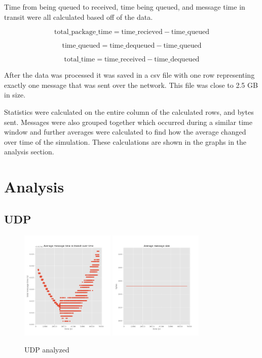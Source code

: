 \documentclass[a4paper,12pt]{article}
\begin{document}
Time from being queued to received, time being queued, and message time in
transit were all calculated based off of the data.

\[\text{total\_package\_time} = \text{time\_recieved} - \text{time\_queued}\]

\[\text{time\_queued} = \text{time\_dequeued} - \text{time\_queued}\]

\[\text{total\_time} = \text{time\_received} - \text{time\_dequeued}\]

After the data was processed it was saved in a csv file with one row
representing exactly one message that was sent over the network. This file was
close to 2.5 GB in size.

Statistics were calculated on the entire column of the calculated rows, and
bytes sent. Messages were also grouped together which occurred during a similar
time window and further averages were calculated to find how the average changed
over time of the simulation. These calculations are shown in the graphs in the
analysis section.

\section{Analysis}

\subsection{UDP}

\begin{figure}[h]
  \centering
  \includegraphics[width=0.4\textwidth]{media/udp.png}
  \includegraphics[width=0.4\textwidth]{media/udp_data.png}
  \caption{UDP analyzed}
\end{figure}
\end{document}
